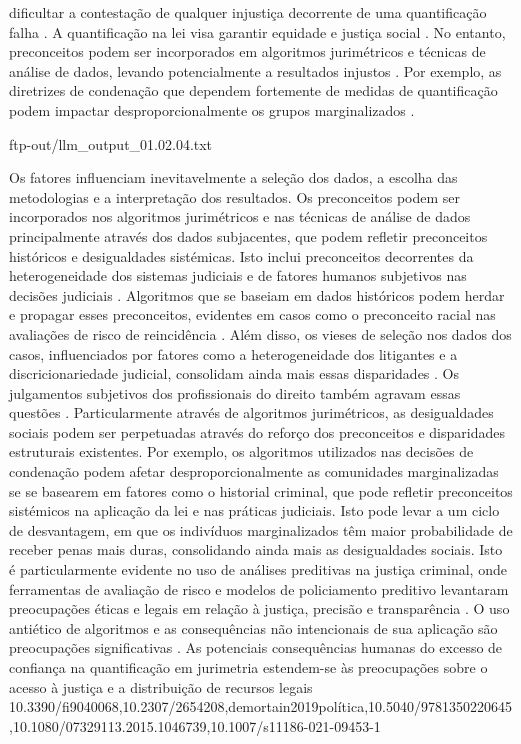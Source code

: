 \begin{agradecimentos}
dificultar a contestação de qualquer injustiça decorrente de uma quantificação falha \cite{10.1590/dados.2022.65.3.267,10.1057/s41599-020-0396-5}. A quantificação na lei visa garantir equidade e justiça social \cite{101007s1102402209481w}. No entanto, preconceitos podem ser incorporados em algoritmos jurimétricos e técnicas de análise de dados, levando potencialmente a resultados injustos \cite{10.1057/s41599-020-00557-0,10.5040/9781350220645}. Por exemplo, as diretrizes de condenação que dependem fortemente de medidas de quantificação podem impactar desproporcionalmente os grupos marginalizados \cite{10.1590/dados.2022.65.3.267,10.3390/fi9040068}. 
    
    ftp-out/llm_output_01.02.04.txt 
    
    Os fatores influenciam inevitavelmente a seleção dos dados, a escolha das metodologias e a interpretação dos resultados. Os preconceitos podem ser incorporados nos algoritmos jurimétricos e nas técnicas de análise de dados principalmente através dos dados subjacentes, que podem refletir preconceitos históricos e desigualdades sistémicas. Isto inclui preconceitos decorrentes da heterogeneidade dos sistemas judiciais e de fatores humanos subjetivos nas decisões judiciais \cite{silva2023,ribeiro1998}. Algoritmos que se baseiam em dados históricos podem herdar e propagar esses preconceitos, evidentes em casos como o preconceito racial nas avaliações de risco de reincidência \cite{gillborn2017}. Além disso, os vieses de seleção nos dados dos casos, influenciados por fatores como a heterogeneidade dos litigantes e a discricionariedade judicial, consolidam ainda mais essas disparidades \cite{ribeiro2021,nunes2016}. Os julgamentos subjetivos dos profissionais do direito também agravam essas questões \cite{ribeiro2021}. Particularmente através de algoritmos jurimétricos, as desigualdades sociais podem ser perpetuadas através do reforço dos preconceitos e disparidades estruturais existentes. Por exemplo, os algoritmos utilizados nas decisões de condenação podem afetar desproporcionalmente as comunidades marginalizadas se se basearem em fatores como o historial criminal, que pode refletir preconceitos sistémicos na aplicação da lei e nas práticas judiciais. Isto pode levar a um ciclo de desvantagem, em que os indivíduos marginalizados têm maior probabilidade de receber penas mais duras, consolidando ainda mais as desigualdades sociais. Isto é particularmente evidente no uso de análises preditivas na justiça criminal, onde ferramentas de avaliação de risco e modelos de policiamento preditivo levantaram preocupações éticas e legais em relação à justiça, precisão e transparência \cite{10.1515/9781400829699,nayler2010}. O uso antiético de algoritmos e as consequências não intencionais de sua aplicação são preocupações significativas \cite{10.1057/s41599-020-0396-5,10.1057/s41599-020-00557-0}. As potenciais consequências humanas do excesso de confiança na quantificação em jurimetria estendem-se às preocupações sobre o acesso à justiça e a distribuição de recursos legais 10.3390/fi9040068,10.2307/2654208,demortain2019política,10.5040/9781350220645,10.1080/07329113.2015.1046739,10.1007/s11186-021-09453-1 
\end{agradecimentos}
